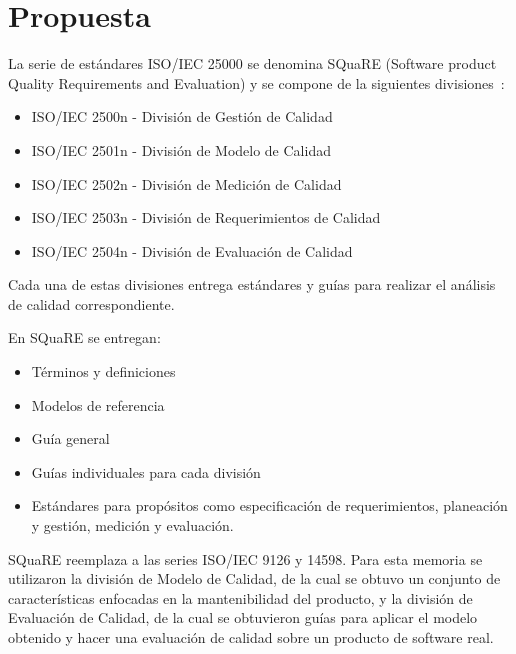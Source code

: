 
\chapter{Propuesta}

La serie de estándares ISO/IEC 25000 se denomina SQuaRE (Software product
Quality Requirements and Evaluation) y se compone de la siguientes divisiones~\cite{25000}:

\begin{itemize}
    \item ISO/IEC 2500n - División de Gestión de Calidad
    \item ISO/IEC 2501n - División de Modelo de Calidad
    \item ISO/IEC 2502n - División de Medición de Calidad
    \item ISO/IEC 2503n - División de Requerimientos de Calidad
    \item ISO/IEC 2504n - División de Evaluación de Calidad
\end{itemize}

Cada una de estas divisiones entrega estándares y guías para realizar
el análisis de calidad correspondiente. 

En SQuaRE se entregan:
\begin{itemize}
    \item Términos y definiciones
    \item Modelos de referencia
    \item Guía general
    \item Guías individuales para cada división
    \item Estándares para propósitos como especificación de requerimientos, 
    planeación y gestión, medición y evaluación.
\end{itemize}

SQuaRE reemplaza a las series ISO/IEC 9126 y 14598.
Para esta memoria se utilizaron la división de Modelo de Calidad, de la cual
se obtuvo un conjunto de características enfocadas en la mantenibilidad del 
producto, y la división de Evaluación de Calidad, de la cual se obtuvieron
guías para aplicar el modelo obtenido y hacer una evaluación de calidad
sobre un producto de software real.

